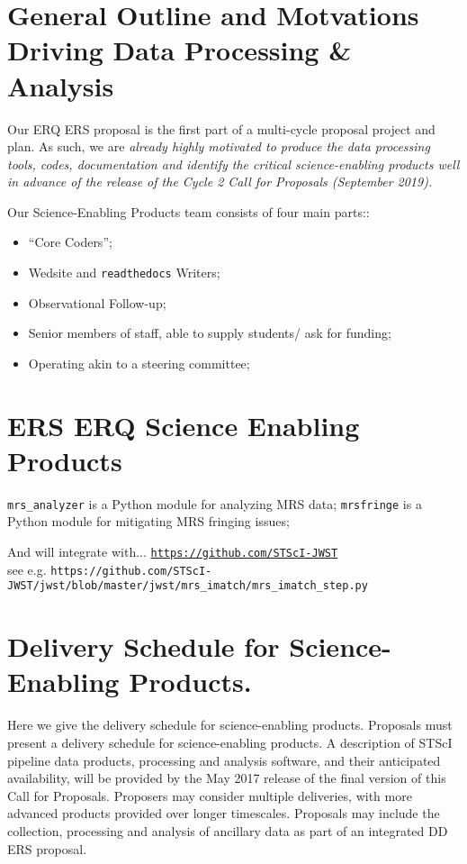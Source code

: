 \section*{General Outline and Motvations Driving Data Processing \& Analysis}
Our ERQ ERS proposal is the first part of a multi-cycle proposal
project and plan.  As such, we are {\it already highly motivated to
produce the data processing tools, codes, documentation and identify
the critical science-enabling products well in advance of the release
of the Cycle 2 Call for Proposals (September 2019).}

\smallskip \smallskip
\noindent
Our Science-Enabling Products team consists of four main parts::
\begin{itemize}
    \item ``Core Coders''; 
    \item  Wedsite and {\tt readthedocs} Writers; 
    \item Observational Follow-up; 
    \item Senior members of staff, able to supply students/ ask for funding; 
    \item Operating akin to a steering committee; 
\end{itemize}


\section*{ERS ERQ Science Enabling Products}
{\tt mrs\_analyzer} is  a Python module for analyzing MRS data; 
{\tt mrsfringe} is a Python module for mitigating MRS fringing issues; 

\smallskip \smallskip
\noindent
And will integrate with...
\href{https://github.com/STScI-JWST}{\tt https://github.com/STScI-JWST} \\
see e.g. 
{\tt https://github.com/STScI-JWST/jwst/blob/master/jwst/mrs\_imatch/mrs\_imatch\_step.py}



\section*{Delivery Schedule for Science-Enabling Products.} 
Here we give the delivery schedule for science-enabling products. 
Proposals must present a delivery schedule for science-enabling products. A description of STScI pipeline data products, processing and analysis software, and their anticipated availability, will be provided by the May 2017 release of the final version of this Call for Proposals.  Proposers may consider multiple deliveries, with more advanced products provided over longer timescales. Proposals may include the collection, processing and analysis of ancillary data as part of an integrated DD ERS proposal.

